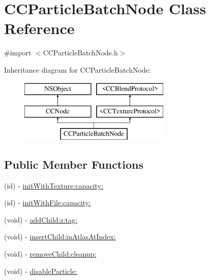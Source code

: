 \hypertarget{interface_c_c_particle_batch_node}{\section{C\-C\-Particle\-Batch\-Node Class Reference}
\label{interface_c_c_particle_batch_node}
}


{\ttfamily \#import $<$C\-C\-Particle\-Batch\-Node.\-h$>$}

Inheritance diagram for C\-C\-Particle\-Batch\-Node\-:\begin{figure}[H]
\begin{center}
\leavevmode
\includegraphics[height=3.000000cm]{interface_c_c_particle_batch_node}
\end{center}
\end{figure}
\subsection*{Public Member Functions}
\begin{DoxyCompactItemize}
\item 
(id) -\/ \hyperlink{interface_c_c_particle_batch_node_a4e6ccd6ef4fe5f8a0f525e75f6ad5812}{init\-With\-Texture\-:capacity\-:}
\item 
(id) -\/ \hyperlink{interface_c_c_particle_batch_node_aadce631b777ca21b2df162e4d15f86a2}{init\-With\-File\-:capacity\-:}
\item 
(void) -\/ \hyperlink{interface_c_c_particle_batch_node_ae36f2e24858526e468215e0a19e299b5}{add\-Child\-:z\-:tag\-:}
\item 
(void) -\/ \hyperlink{interface_c_c_particle_batch_node_a892326c74f8eee345d17f36060e809c1}{insert\-Child\-:in\-Atlas\-At\-Index\-:}
\item 
(void) -\/ \hyperlink{interface_c_c_particle_batch_node_a44096e9e4b9d8a1d0953c8bc64217e36}{remove\-Child\-:cleanup\-:}
\item 
(void) -\/ \hyperlink{interface_c_c_particle_batch_node_a1399625b3357d887349735462c4dd033}{disable\-Particle\-:}
\end{DoxyCompactItemize}
